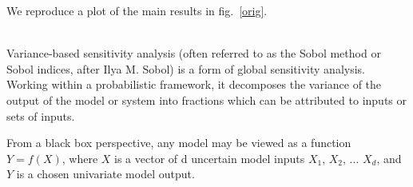 \documentclass{beamer}
\begin{document}
\begin{frame}[t, fragile]
\begin{columns}[onlytextwidth]
\begin{column}{.49\linewidth}
      We reproduce a plot of the main results in fig.~\ref{orig}.

      \vspace*{1ex}
      \textbf{}\\
      Variance-based sensitivity analysis (often referred to as the Sobol method
      or Sobol indices, after Ilya M. Sobol\cite{Sobol1993,Sobol2001}) is a form of global 
      sensitivity analysis. Working within a probabilistic framework, it decomposes 
      the variance of the output of the model or system into fractions which can
      be attributed to inputs or sets of inputs.

      From a black box perspective, any model may be viewed as a function $Y = f(X)$,
      where $X$ is a vector of d uncertain model inputs {$X_1$, $X_2$, ... $X_d$},
      and $Y$ is a chosen univariate model output.


      



\end{column}
\end{columns}
\end{frame}
\end{document}
